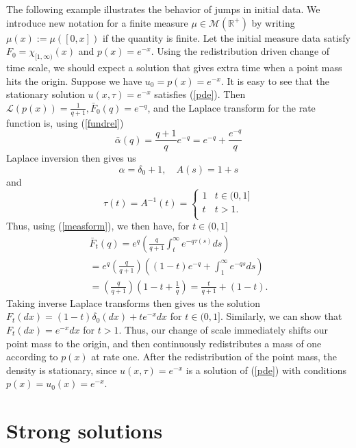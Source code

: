 The following example illustrates the behavior of jumps in initial data.  We  introduce new notation for a finite measure $\mu \in \mathcal M(\mathbb{R}^+)$ by writing $\mu(x):=\mu([0,x])$ if the quantity is finite. Let the  initial measure data satisfy $F_0 = \chi_{[1,\infty)}(x)$ and $p(x) = e^{-x}$. Using the redistribution driven change of time scale, we should expect a solution that gives extra time when a point mass hits the origin.  Suppose we have $u_0 = p(x) = e^{-x}$.  It is easy to see that the stationary solution $u(x,\tau) = e^{-x}$ satisfies (\ref{pde}). Then $\mathcal{L}(p(x)) = \frac{1}{q+1},\bar F_0(q) = e^{-q}$, and the Laplace transform for the rate function is, using (\ref{fundrel}) 
\begin{equation}
\bar \alpha(q) = \frac{q+1}{q}e^{-q} = e^{-q}+\frac{e^{-q}}q
\end{equation}
Laplace inversion then gives us 
\begin{equation}
\alpha = \delta_0+1, \quad A(s) = 1+s 
\end{equation}
and
\begin{equation}
\tau(t) = A^{-1}(t) = \begin{cases}1 & t \in (0,1] \\
t & t>1. \\
\end{cases}
\end{equation}
Thus, using (\ref{measform}), we then have, for $t \in (0,1]$
\begin{eqnarray}
\bar F_t(q) = e^{q}(\frac {q}{q+1} \int _t^\infty e^{-q\tau(s)}ds)\\
 = e^{q}(\frac {q}{q+1})((1-t)e^{-q}+ \int _1^\infty e^{-qs}ds) \nonumber\\
  = (\frac{q}{q+1})(1-t+\frac 1q) = \frac{t}{q+1}+(1-t).\nonumber
\end{eqnarray}
Taking inverse Laplace transforms then gives us the solution  $F_t(dx) = (1-t)\delta_0(dx)+te^{-x}dx$ for $t \in (0,1]$.  Similarly, we can show that $F_t(dx) = e^{-x}dx$ for $t>1$.  Thus, our change of scale immediately shifts our point mass to the origin, and then continuously redistributes a mass of one  according to $p(x)$ at rate one.  After the redistribution of the point mass, the density is stationary, since $u(x,\tau) = e^{-x}$ is a solution of (\ref{pde}) with conditions $p(x) = u_0(x) = e^{-x}$. 

\section{Strong solutions}\label{strongsection}

